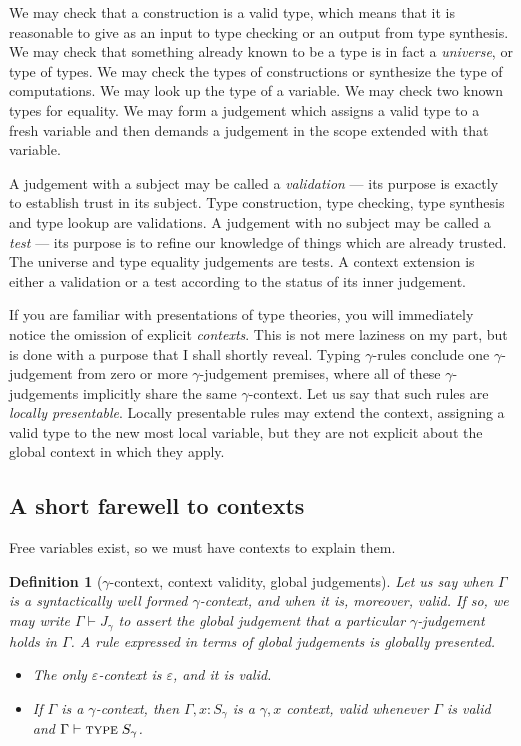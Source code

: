 \documentclass{jfp1}
\newtheorem{definition}[theorem]{Definition}
\newcommand{\emp}{\varepsilon}
\begin{document}
We may check that a construction is a valid type, which means that it
is reasonable to give as an input to type checking or an output from
type synthesis. We may check that something already known to be a type is in fact
a \emph{universe}, or type of types. We may check the types of constructions or synthesize
the type of computations. We may look up the type of a variable. We may check two known types
for equality. We may form a judgement which assigns a valid type to a fresh variable and
then demands a judgement in the scope extended with that variable.

A judgement with a subject may be called a \emph{validation} --- its
purpose is exactly to establish trust in its subject. Type construction, type checking, type synthesis and type lookup are validations. A judgement with no subject may be called a
\emph{test} --- its purpose is to refine our knowledge of things which are already trusted.
The universe and type equality judgements are tests. A context extension is either a validation
or a test according to the status of its inner judgement.

If you are familiar with presentations of type theories, you will immediately notice the
omission of explicit \emph{contexts}. This is not mere laziness on my part, but is done
with a purpose that I shall shortly reveal. Typing $\gamma$-rules conclude one $\gamma$-judgement
from zero or more $\gamma$-judgement premises, where all of these $\gamma$-judgements
implicitly share the same $\gamma$-context. Let us say that such rules are \emph{locally presentable}.
Locally presentable rules may extend the context, assigning a valid type to the new most local
variable, but they are not explicit about the global context in which they apply.


\subsection{A short farewell to contexts}

Free variables exist, so we must have contexts to explain them.

\begin{definition}[$\gamma$-context, context validity, global judgements]
  Let us say when $\Gamma$ is a syntactically well formed $\gamma$-context, and when it is,
  moreover, \emph{valid}. If so, we may write $\Gamma\vdash J_\gamma$ to assert
  the \emph{global judgement} that a particular $\gamma$-judgement holds in $\Gamma$.
  A rule expressed in terms of global judgements is \emph{globally presented}.
  \begin{itemize}
  \item The only $\emp$-context is $\emp$, and it is valid.
  \item If $\Gamma$ is a $\gamma$-context, then $\Gamma,x\!:\!S_\gamma$ is a $\gamma,x$ context,
    valid whenever $\Gamma$ is valid and $\Gamma\vdash\textsc{type}\;S_\gamma$.
  \end{itemize}
\end{definition}
\end{document}

